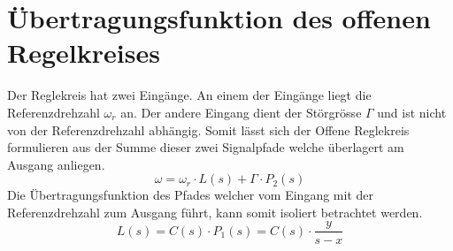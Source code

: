 \section{Übertragungsfunktion des offenen Regelkreises}
Der Reglekreis hat zwei Eingänge. An einem der Eingänge liegt die
Referenzdrehzahl $\omega_r$ an. Der andere Eingang dient der Störgrösse
$\Gamma$ und ist nicht von der Referenzdrehzahl abhängig. Somit lässt
sich der Offene Reglekreis formulieren aus der Summe dieser zwei Signalpfade
welche überlagert am Ausgang anliegen.
\[
	\omega = \omega_r \cdot L(s) + \Gamma \cdot P_2(s)
\]
Die Übertragungsfunktion des Pfades welcher vom Eingang mit der Referenzdrehzahl
zum Ausgang führt, kann somit isoliert betrachtet werden.
\[
	L(s) = C(s) \cdot P_1(s) = C(s) \cdot \frac{y}{s-x}	
\]
